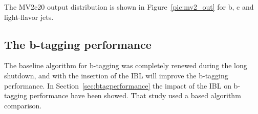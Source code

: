 The MV2c20 output distribution is shown in Figure~\ref{pic:mv2_out} for b, c and light-flavor jets.
\subsection{The b-tagging performance}
The \runtwo baseline algorithm for b-tagging was completely renewed during the long shutdown, and with the insertion of the IBL will improve the b-tagging performance. In Section~\ref{sec:btagperformance} the impact of the IBL on b-tagging performance have been showed. That study used a \runtwo based algorithm comparison.
\begin{figure}
\centering
\null\hfill
{}
\hfill
{}
\hfill \null
\null \hfill
{}

\end{figure}
